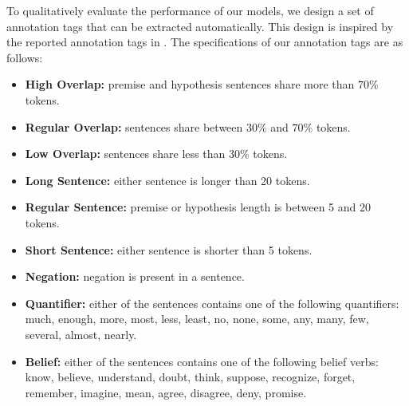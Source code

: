 \documentclass[11pt,a4paper]{article}
\begin{document}
	To qualitatively evaluate the performance of our models, we design a set of annotation tags that can be extracted automatically. This design is inspired by the reported annotation tags in \citet{multinli}. The specifications of our annotation tags are as follows:
	
	
		\begin{itemize}
		\item \textbf{High Overlap:} premise and hypothesis sentences share more than $70\%$ tokens.
		\item \textbf{Regular Overlap:} sentences share between $30\%$ and $70\%$ tokens.
		\item \textbf{Low Overlap:} sentences share less than $30\%$ tokens.
		\item \textbf{Long Sentence:} either sentence is longer than 20 tokens.
		\item \textbf{Regular Sentence:} premise or hypothesis length is between 5 and 20 tokens.
		\item \textbf{Short Sentence:} either sentence is shorter than 5 tokens.
		\item \textbf{Negation:} negation is present in a sentence.
		\item \textbf{Quantifier:} either of the sentences contains one of the following quantifiers: much, enough, more, most, less, least, no, none, some, any, many, few, several, almost, nearly.
		\item \textbf{Belief:} either of the sentences contains one of the following belief verbs: know, believe, understand, doubt, think, suppose, recognize, forget, remember, imagine, mean, agree, disagree, deny, promise.
	\end{itemize}
	
\end{document}
